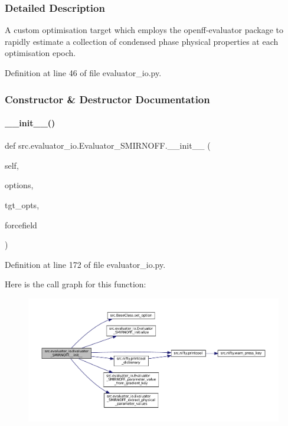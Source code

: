 \subsubsection{Detailed Description}
A custom optimisation target which employs the {\ttfamily openff-\/evaluator} package to rapidly estimate a collection of condensed phase physical properties at each optimisation epoch. 



Definition at line 46 of file evaluator\+\_\+io.\+py.



\subsubsection{Constructor \& Destructor Documentation}
\mbox{\label{classsrc_1_1evaluator__io_1_1Evaluator__SMIRNOFF_a97531ba6b45131f7940470ed0143e45a}} 
\paragraph{\texorpdfstring{\+\_\+\+\_\+init\+\_\+\+\_\+()}{\_\_init\_\_()}}
{\footnotesize\ttfamily def src.\+evaluator\+\_\+io.\+Evaluator\+\_\+\+S\+M\+I\+R\+N\+O\+F\+F.\+\_\+\+\_\+init\+\_\+\+\_\+ (\begin{DoxyParamCaption}\item[{}]{self,  }\item[{}]{options,  }\item[{}]{tgt\+\_\+opts,  }\item[{}]{forcefield }\end{DoxyParamCaption})}



Definition at line 172 of file evaluator\+\_\+io.\+py.

Here is the call graph for this function\+:
\nopagebreak
\begin{figure}[H]
\begin{center}
\leavevmode
\includegraphics[width=350pt]{classsrc_1_1evaluator__io_1_1Evaluator__SMIRNOFF_a97531ba6b45131f7940470ed0143e45a_cgraph}
\end{center}
\end{figure}


